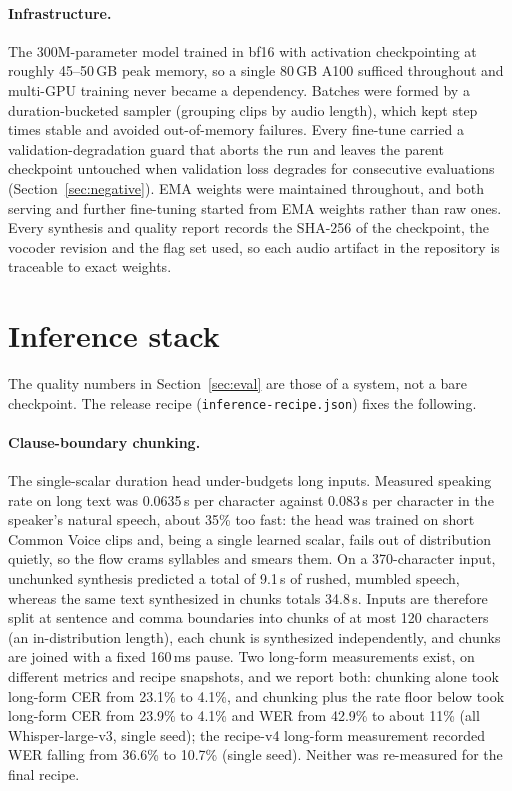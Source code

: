 \documentclass[10pt,twocolumn]{article}
\newcommand{\code}[1]{\texttt{#1}}
\begin{document}
\paragraph{Infrastructure.} The 300M-parameter model trained in bf16 with activation checkpointing at roughly 45--50\,GB peak memory, so a single 80\,GB A100 sufficed throughout and multi-GPU training never became a dependency. Batches were formed by a duration-bucketed sampler (grouping clips by audio length), which kept step times stable and avoided out-of-memory failures. Every fine-tune carried a validation-degradation guard that aborts the run and leaves the parent checkpoint untouched when validation loss degrades for consecutive evaluations (Section~\ref{sec:negative}). EMA weights were maintained throughout, and both serving and further fine-tuning started from EMA weights rather than raw ones. Every synthesis and quality report records the SHA-256 of the checkpoint, the vocoder revision and the flag set used, so each audio artifact in the repository is traceable to exact weights.

\section{Inference stack}
\label{sec:inference}

The quality numbers in Section~\ref{sec:eval} are those of a system, not a bare checkpoint. The release recipe (\code{inference-recipe.json}) fixes the following.

\paragraph{Clause-boundary chunking.} The single-scalar duration head under-budgets long inputs. Measured speaking rate on long text was 0.0635\,s per character against 0.083\,s per character in the speaker's natural speech, about 35\% too fast: the head was trained on short Common Voice clips and, being a single learned scalar, fails out of distribution quietly, so the flow crams syllables and smears them. On a 370-character input, unchunked synthesis predicted a total of 9.1\,s of rushed, mumbled speech, whereas the same text synthesized in chunks totals 34.8\,s. Inputs are therefore split at sentence and comma boundaries into chunks of at most 120 characters (an in-distribution length), each chunk is synthesized independently, and chunks are joined with a fixed 160\,ms pause. Two long-form measurements exist, on different metrics and recipe snapshots, and we report both: chunking alone took long-form CER from 23.1\% to 4.1\%, and chunking plus the rate floor below took long-form CER from 23.9\% to 4.1\% and WER from 42.9\% to about 11\% (all Whisper-large-v3, single seed); the recipe-v4 long-form measurement recorded WER falling from 36.6\% to 10.7\% (single seed). Neither was re-measured for the final recipe.
\end{document}
